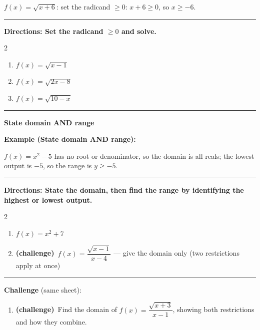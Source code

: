 \documentclass[12pt]{article}
\begin{document}
$f(x)=\sqrt{x+6}$: set the radicand $\ge 0$: $x+6\ge 0$, so $x\ge -6$.

\vspace{0.2cm}\hrule\vspace{0.35cm}
\textbf{Directions: Set the radicand $\ge 0$ and solve.}

\begin{multicols}{2}
\begin{enumerate}[label=\textbf{\arabic*.}, start=5, itemsep=1.3cm]
  \item $\displaystyle f(x)=\sqrt{x-1}$
  \item $\displaystyle f(x)=\sqrt{2x-8}$
  \item $\displaystyle f(x)=\sqrt{10-x}$
\end{enumerate}
\end{multicols}
\vspace{0.25cm}\hrule\vspace{0.35cm}

\begin{center}{\Large \textbf{State domain AND range}}\end{center}\vspace{0.2cm}
\textbf{Example (State domain AND range):}

$f(x)=x^{2}-5$ has no root or denominator, so the domain is all reals; the lowest output is $-5$, so the range is $y\ge -5$.

\vspace{0.2cm}\hrule\vspace{0.35cm}
\textbf{Directions: State the domain, then find the range by identifying the highest or lowest output.}

\begin{multicols}{2}
\begin{enumerate}[label=\textbf{\arabic*.}, start=8, itemsep=2cm]
  \item $\displaystyle f(x)=x^{2}+7$
  \item \textbf{(challenge)}\ $f(x)=\dfrac{\sqrt{x-1}}{x-4}$ --- give the domain only (two restrictions apply at once)
\end{enumerate}
\end{multicols}

\vspace{0.2cm}\hrule\vspace{0.3cm}
\textbf{Challenge} (same sheet):\\[4pt]
\begin{enumerate}[label=\textbf{\arabic*.}, start=10, itemsep=2.2cm]
  \item \textbf{(challenge)}\ Find the domain of $f(x)=\dfrac{\sqrt{x+3}}{x-1}$, showing both restrictions and how they combine.
\end{enumerate}
\end{document}
